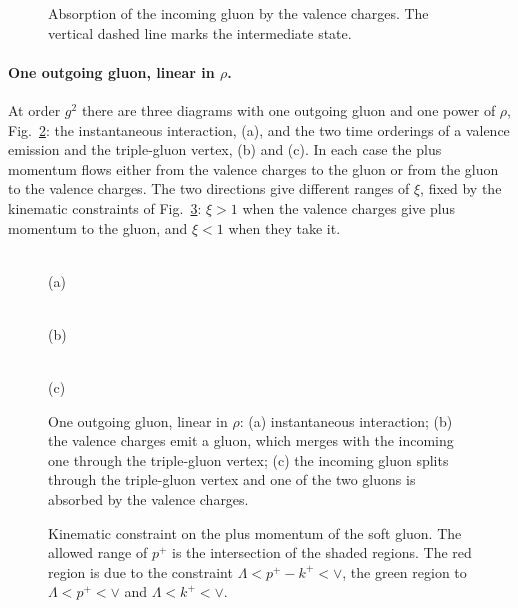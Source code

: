 \begin{figure}[t]
\centering
{}
\caption{Absorption of the incoming gluon by the valence charges. The vertical dashed line marks the
intermediate state.}
\label{fig:gtovac}
\end{figure}

\paragraph{One outgoing gluon, linear in $\rho$.}
At order $g^{2}$ there are three diagrams with one outgoing gluon and one power of $\rho$,
Fig.~\ref{fig:onegrho}: the instantaneous interaction, (a), and the two time orderings of a valence
emission and the triple-gluon vertex, (b) and (c). In each case the plus momentum flows either from the
valence charges to the gluon or from the gluon to the valence charges. The two directions give
different ranges of $\xi$, fixed by the kinematic constraints of Fig.~\ref{fig:kinem}: $\xi>1$ when the
valence charges give plus momentum to the gluon, and $\xi<1$ when they take it.

\begin{figure}[t]
\centering
\begin{minipage}[b]{0.32\textwidth}\centering{}\\[2pt](a)\end{minipage}\hfill
\begin{minipage}[b]{0.32\textwidth}\centering{}\\[2pt](b)\end{minipage}\hfill
\begin{minipage}[b]{0.32\textwidth}\centering{}\\[2pt](c)\end{minipage}
\caption{One outgoing gluon, linear in $\rho$: (a) instantaneous interaction; (b) the valence charges
emit a gluon, which merges with the incoming one through the triple-gluon vertex; (c) the incoming
gluon splits through the triple-gluon vertex and one of the two gluons is absorbed by the valence
charges.}
\label{fig:onegrho}
\end{figure}

\begin{figure}[t]
\centering
{}
\caption{Kinematic constraint on the plus momentum of the soft gluon. The allowed range of $p^{+}$ is
the intersection of the shaded regions. The red region is due to the constraint
$\Lambda<p^{+}-k^{+}<\vee$, the green region to $\Lambda<p^{+}<\vee$ and $\Lambda<k^{+}<\vee$.}
\label{fig:kinem}
\end{figure}

